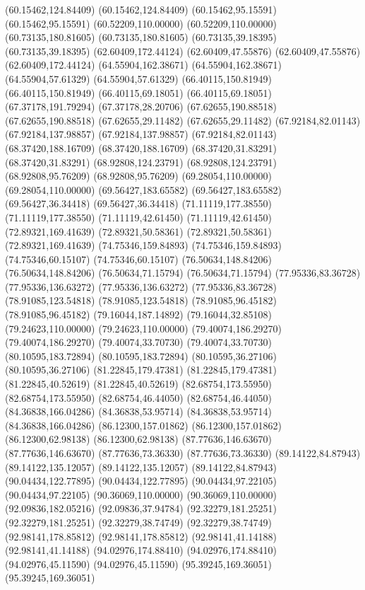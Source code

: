 {(60.15462,124.84409) (60.15462,124.84409) (60.15462,95.15591) (60.15462,95.15591) (60.52209,110.00000) (60.52209,110.00000) (60.73135,180.81605) (60.73135,180.81605)
(60.73135,39.18395) (60.73135,39.18395) (62.60409,172.44124) (62.60409,47.55876) (62.60409,47.55876) (62.60409,172.44124) (64.55904,162.38671) (64.55904,162.38671)
(64.55904,57.61329) (64.55904,57.61329) (66.40115,150.81949) (66.40115,150.81949) (66.40115,69.18051) (66.40115,69.18051) (67.37178,191.79294) (67.37178,28.20706)
(67.62655,190.88518) (67.62655,190.88518) (67.62655,29.11482) (67.62655,29.11482) (67.92184,82.01143) (67.92184,137.98857) (67.92184,137.98857) (67.92184,82.01143)
(68.37420,188.16709) (68.37420,188.16709) (68.37420,31.83291) (68.37420,31.83291) (68.92808,124.23791) (68.92808,124.23791) (68.92808,95.76209) (68.92808,95.76209)
(69.28054,110.00000) (69.28054,110.00000) (69.56427,183.65582) (69.56427,183.65582) (69.56427,36.34418) (69.56427,36.34418) (71.11119,177.38550) (71.11119,177.38550)
(71.11119,42.61450) (71.11119,42.61450) (72.89321,169.41639) (72.89321,50.58361) (72.89321,50.58361) (72.89321,169.41639) (74.75346,159.84893) (74.75346,159.84893)
(74.75346,60.15107) (74.75346,60.15107) (76.50634,148.84206) (76.50634,148.84206) (76.50634,71.15794) (76.50634,71.15794) (77.95336,83.36728) (77.95336,136.63272)
(77.95336,136.63272) (77.95336,83.36728) (78.91085,123.54818) (78.91085,123.54818) (78.91085,96.45182) (78.91085,96.45182) (79.16044,187.14892) (79.16044,32.85108)
(79.24623,110.00000) (79.24623,110.00000) (79.40074,186.29270) (79.40074,186.29270) (79.40074,33.70730) (79.40074,33.70730) (80.10595,183.72894) (80.10595,183.72894)
(80.10595,36.27106) (80.10595,36.27106) (81.22845,179.47381) (81.22845,179.47381) (81.22845,40.52619) (81.22845,40.52619) (82.68754,173.55950) (82.68754,173.55950)
(82.68754,46.44050) (82.68754,46.44050) (84.36838,166.04286) (84.36838,53.95714) (84.36838,53.95714) (84.36838,166.04286) (86.12300,157.01862) (86.12300,157.01862)
(86.12300,62.98138) (86.12300,62.98138) (87.77636,146.63670) (87.77636,146.63670) (87.77636,73.36330) (87.77636,73.36330) (89.14122,84.87943) (89.14122,135.12057)
(89.14122,135.12057) (89.14122,84.87943) (90.04434,122.77895) (90.04434,122.77895) (90.04434,97.22105) (90.04434,97.22105) (90.36069,110.00000) (90.36069,110.00000)
(92.09836,182.05216) (92.09836,37.94784) (92.32279,181.25251) (92.32279,181.25251) (92.32279,38.74749) (92.32279,38.74749) (92.98141,178.85812) (92.98141,178.85812)
(92.98141,41.14188) (92.98141,41.14188) (94.02976,174.88410) (94.02976,174.88410) (94.02976,45.11590) (94.02976,45.11590) (95.39245,169.36051) (95.39245,169.36051)
}
